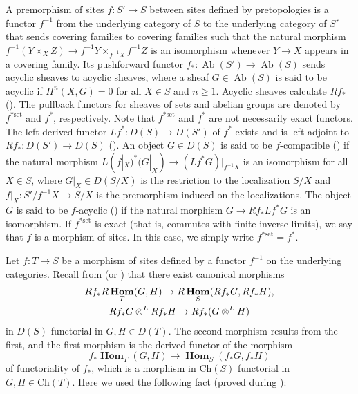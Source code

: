 \documentclass{amsart}
\theoremstyle{remark}
\numberwithin{equation}{subsection}
\newcommand{\tensor}{\mathbin{\otimes}}
\newcommand{\set}{\mathrm{set}}
\newcommand{\alg}[1]{\mathbf{#1}}
\newcommand{\Ch}{\mathrm{Ch}}
\DeclareMathOperator{\Ab}{Ab}
\DeclareMathOperator{\sheafhom}{\alg{Hom}}
\begin{document}
A premorphism of sites $f \colon S' \to S$ between sites defined by pretopologies
is a functor $f^{-1}$ from the underlying category of $S$ to the underlying category of $S'$
that sends covering families to covering families
such that the natural morphism $f^{-1}(Y \times_{X} Z) \to f^{-1} Y \times_{f^{-1} X} f^{-1} Z$
is an isomorphism whenever $Y \to X$ appears in a covering family.
Its pushforward functor $f_{\ast} \colon \Ab(S') \to \Ab(S)$ sends acyclic sheaves to acyclic sheaves,
where a sheaf $G \in \Ab(S)$ is said to be acyclic
if $H^{n}(X, G) = 0$ for all $X \in S$ and $n \ge 1$.
Acyclic sheaves calculate $R f_{\ast}$ (\cite[Proposition 2.4.2]{SuzCurve}).
The pullback functors for sheaves of sets and abelian groups are
denoted by $f^{\ast \set}$ and $f^{\ast}$, respectively.
Note that $f^{\ast \set}$ and $f^{\ast}$ are not necessarily exact functors.
The left derived functor $L f^{\ast} \colon D(S) \to D(S')$ of $f^{\ast}$ exists
and is left adjoint to $R f_{\ast} \colon D(S') \to D(S)$
(\cite[the paragraph after Definition 2.3]{Suz21}).
An object $G \in D(S)$ is said to be $f$-compatible (\cite[Definition 2.5 (a)]{Suz21})
if the natural morphism $L (f|_{X})^{\ast}(G|_{X}) \to (L f^{\ast} G)|_{f^{-1} X}$
is an isomorphism for all $X \in S$,
where $G|_{X} \in D(S / X)$ is the restriction to the localization $S / X$
and $f|_{X} \colon S' / f^{-1} X \to S / X$ is the premorphism induced on the localizations.
The object $G$ is said to be $f$-acyclic (\cite[Definition 2.5 (b)]{Suz21})
if the natural morphism $G \to R f_{\ast} L f^{\ast} G$ is an isomorphism.
If $f^{\ast \set}$ is exact (that is, commutes with finite inverse limits),
we say that $f$ is a morphism of sites.
In this case, we simply write $f^{\ast \set} = f^{\ast}$.

Let $f \colon T \to S$ be a morphism of sites
defined by a functor $f^{-1}$ on the underlying categories.
Recall from \cite[Proposition 2.4]{Suz21} (or \cite[Tags 0B6C, 0B6D]{Sta21})
that there exist canonical morphisms
	\begin{gather}
			\notag
				R f_{\ast} R \sheafhom_{T}(G, H)
			\to
				R \sheafhom_{S}(R f_{\ast} G, R f_{\ast} H),
		\\ \label{0327}
				R f_{\ast} G \tensor^{L} R f_{\ast} H
			\to
				R f_{\ast}(G \tensor^{L} H)
	\end{gather}
in $D(S)$ functorial in $G, H \in D(T)$.
The second morphism results from the first,
and the first morphism is the derived functor of the morphism
	\[
			f_{\ast} \sheafhom_{T}(G, H)
		\to
			\sheafhom_{S}(f_{\ast} G, f_{\ast} H)
	\]
of functoriality of $f_{\ast}$,
which is a morphism in $\Ch(S)$ functorial in $G, H \in \Ch(T)$.
Here we used the following fact (proved during \cite[Proposition 2.4]{Suz21}):
\end{document}
